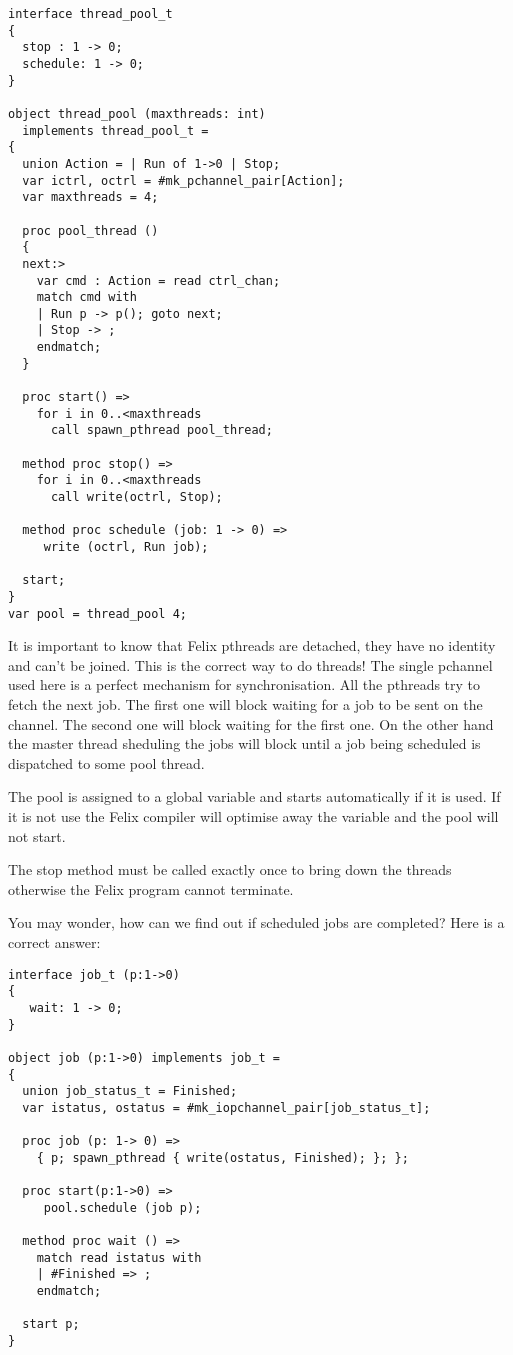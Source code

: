 \documentclass[oneside]{book}
\begin{document}
\begin{verbatim}
interface thread_pool_t
{
  stop : 1 -> 0;
  schedule: 1 -> 0;
}

object thread_pool (maxthreads: int) 
  implements thread_pool_t =
{
  union Action = | Run of 1->0 | Stop;
  var ictrl, octrl = #mk_pchannel_pair[Action];
  var maxthreads = 4;

  proc pool_thread ()
  {
  next:>
    var cmd : Action = read ctrl_chan;
    match cmd with
    | Run p -> p(); goto next;
    | Stop -> ;
    endmatch;
  }

  proc start() =>
    for i in 0..<maxthreads
      call spawn_pthread pool_thread;

  method proc stop() =>
    for i in 0..<maxthreads
      call write(octrl, Stop);

  method proc schedule (job: 1 -> 0) =>
     write (octrl, Run job);

  start;
}
var pool = thread_pool 4;
\end{verbatim}

It is important to know that Felix pthreads are detached,
they have no identity and can't be joined. This is the correct
way to do threads! The single pchannel used here is a perfect
mechanism for synchronisation. All the pthreads try to fetch
the next job. The first one will block waiting for a job to
be sent on the channel. The second one will block waiting
for the first one. On the other hand the master thread sheduling
the jobs will block until a job being scheduled is dispatched
to some pool thread.

The pool is assigned to a global variable and starts automatically
if it is used. If it is not use the Felix compiler will optimise
away the variable and the pool will not start.

The stop method must be called exactly once to bring down the threads
otherwise the Felix program cannot terminate.

You may wonder, how can we find out if scheduled jobs are 
completed? Here is a correct answer:

\begin{verbatim}
interface job_t (p:1->0) 
{
   wait: 1 -> 0;
}

object job (p:1->0) implements job_t =
{
  union job_status_t = Finished;
  var istatus, ostatus = #mk_iopchannel_pair[job_status_t];

  proc job (p: 1-> 0) =>
    { p; spawn_pthread { write(ostatus, Finished); }; };

  proc start(p:1->0) =>
     pool.schedule (job p);

  method proc wait () =>
    match read istatus with
    | #Finished => ;
    endmatch;

  start p;
} 
\end{verbatim}
\end{document}
